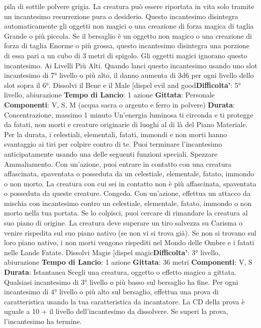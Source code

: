 \begin{multicols}{2}
pila di sottile polvere grigia. La creatura può essere
riportata in vita solo tramite un incantesimo
resurrezione pura o desiderio.
Questo incantesimo disintegra automaticamente gli
oggetti non magici o una creazione di forza magica di
taglia Grande o più piccola. Se il bersaglio è un oggetto
non magico o una creazione di forza di taglia Enorme o
più grossa, questo incantesimo disintegra una porzione
di essa pari a un cubo di 3 metri di spigolo. Gli oggetti
magici ignorano questo incantesimo.
Ai Livelli Più Alti. Quando lanci questo incantesimo
usando uno slot incantesimo di 7° livello o più alto, il
danno aumenta di 3d6 per ogni livello dello slot sopra il
6°.
Dissolvi il Bene e il Male
[dispel evil and good\textbf{Difficolta'}:
5° livello, abiurazione
\textbf{Tempo di Lancio}: 1 azione
\textbf{Gittata}: Personale
\textbf{Componenti}: V, S, M (acqua sacra o argento e ferro in
polvere)
\textbf{Durata}: Concentrazione, massimo 1 minuto
Un’energia luminosa ti circonda e ti protegge da fatati,
non morti e creature originarie di luoghi al di là del
Piano Materiale. Per la durata, i celestiali, elementali,
fatati, immondi e non morti hanno svantaggio ai tiri per
colpire contro di te.
Puoi terminare l’incantesimo anticipatamente usando
una delle seguenti funzioni speciali.
Spezzare Ammaliamento. Con un’azione, puoi entrare
in contatto con una creatura affascinata, spaventata o
posseduta da un celestiale, elementale, fatato,
immondo o non morto. La creatura con cui sei in
contatto non è più affascinata, spaventata o posseduta
da queste creature.
Congedo. Con un’azione, effettua un attacco da
mischia con incantesimo contro un celestiale,
elementale, fatato, immondo o non morto nella tua
portata. Se lo colpisci, puoi cercare di rimandare la
creatura al suo piano di origine. La creatura deve
superare un tiro salvezza su Carisma o venire rispedita
sul suo piano nativo (se non vi si trova già). Se non si
trovano sul loro piano nativo, i non morti vengono
rispediti nel Mondo delle Ombre e i fatati nelle Lande
Fatate.
Dissolvi Magie
[dispel magic\textbf{Difficolta'}:
3° livello, abiurazione
\textbf{Tempo di Lancio}: 1 azione
\textbf{Gittata}: 36 metri
\textbf{Componenti}: V, S
\textbf{Durata}: Istantanea
Scegli una creatura, oggetto o effetto magico a gittata.
Qualsiasi incantesimo di 3° livello o più basso sul
bersaglio ha fine. Per ogni incantesimo di 4° livello o più
alto sul bersaglio, effettua una prova di caratteristica
usando la tua caratteristica da incantatore. La CD della
prova è uguale a 10 + il livello dell’incantesimo da
dissolvere. Se superi la prova, l’incantesimo ha termine.

\end{multicols}
